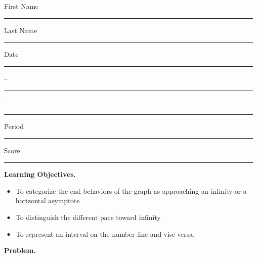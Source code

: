 \documentclass[twoside, 10pt]{article}
\title{}
\date{}
\begin{document}
\noindent
{\large
First Name \rule{6em}{.1pt}Last Name \rule{6em}{.1pt} Date \rule{1.5em}{.1pt} -- \rule{1.5em}{.1pt} -- \rule{1.5em}{.1pt} Period \rule{2em}{.1pt} Score \rule{2em}{.1pt}
}
\vspace{1em}

{\noindent \bf Learning Objectives.}
\begin{itemize}
\item
To categorize the end behaviors of the graph as approaching an infinity or a horizontal asymptote
\item
To distinguish the different pace toward infinity
\item
To represent an interval on the number line and vise versa.
\end{itemize}

{\noindent\bf Problem.}
\end{document}
